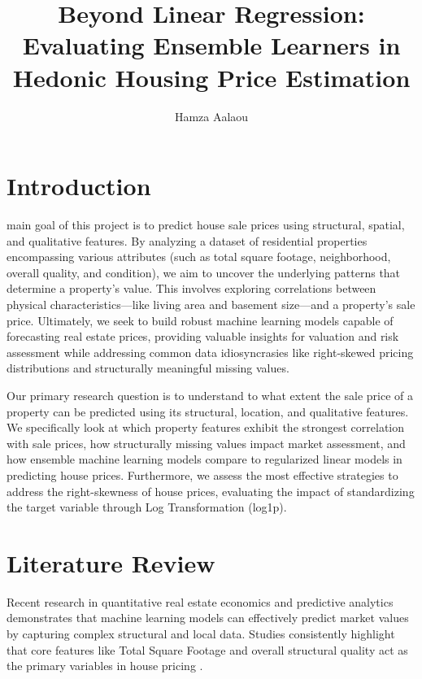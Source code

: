 \documentclass[eng]{ajceam-class}
\title{Beyond Linear Regression: Evaluating Ensemble Learners in Hedonic Housing Price Estimation}
\author[1]{Hamza Aalaou}
\affil[1]{Data Science Department, University Name, City, Country}
\begin{document}
\maketitle
\thispagestyle{fancy}
\printcontactdata

\section{Introduction}
 main goal of this project is to predict house sale prices using structural, spatial, and qualitative features. By analyzing a dataset of residential properties encompassing various attributes (such as total square footage, neighborhood, overall quality, and condition), we aim to uncover the underlying patterns that determine a property's value. This involves exploring correlations between physical characteristics---like living area and basement size---and a property's sale price. Ultimately, we seek to build robust machine learning models capable of forecasting real estate prices, providing valuable insights for valuation and risk assessment while addressing common data idiosyncrasies like right-skewed pricing distributions and structurally meaningful missing values.

Our primary research question is to understand to what extent the sale price of a property can be predicted using its structural, location, and qualitative features. We specifically look at which property features exhibit the strongest correlation with sale prices, how structurally missing values impact market assessment, and how ensemble machine learning models compare to regularized linear models in predicting house prices. Furthermore, we assess the most effective strategies to address the right-skewness of house prices, evaluating the impact of standardizing the target variable through Log Transformation (log1p).

\section{Literature Review}

Recent research in quantitative real estate economics and predictive analytics demonstrates that machine learning models can effectively predict market values by capturing complex structural and local data. Studies consistently highlight that core features like Total Square Footage and overall structural quality act as the primary variables in house pricing \cite{Mitchell2001}.
\end{document}
